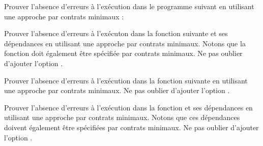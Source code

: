 



Prouver l'absence d'erreurs à l'exécution dans le programme suivant en utilisant
une approche par contrats minimaux :






Prouver l'absence d'erreurs à l'exécuton dans la fonction 
suivante et ses dépendances en utilisant une approche par contrats minimaux.
Notons que la fonction  doit également être spécifiée par
contrats minimaux. Ne pas oublier d'ajouter l'option .







Prouver l'absence d'erreurs à l'exécution dans la fonction 
suivante en utilisant une approche par contrats minimaux. Ne pas oublier d'ajouter
l'option .






Prouver l'absence d'erreurs à l'exécution dans la fonction 
et ses dépendances en utilisant une approche par contrats minimaux. Notons que
ces dépendances doivent également être spécifiées par contrats minimaux. Ne pas
oublier d'ajouter l'option .


